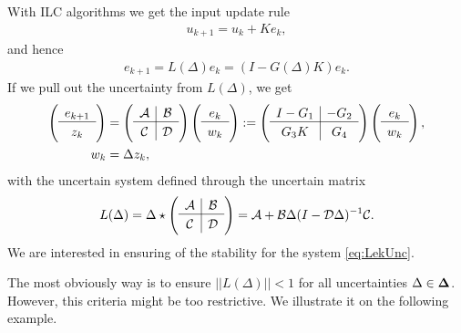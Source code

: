 With ILC algorithms we get the input update rule
\begin{align}
u_{k+1} = u_k + Ke_k,
\end{align}
and hence 
\begin{align}
\label{eq:LekUnc}
e_{k+1} = L(\Delta)e_k = (I - G(\Delta)K) e_k.
\end{align}
If we pull out the uncertainty from $L(\Delta)$, we get 
%
\begin{align}
\begin{split}
\left(\begin{array}{c}
e_{k+1} \\ \hline z_k
\end{array}\right) &= 
\left(\begin{array}{c| c}
\c{A} & \c{B} \\
\hline
\c{C} & \c{D}
\end{array}\right) \left(\begin{array}{c}
e_{k}  \\\hline w_k
\end{array}\right):= 
\left(\begin{array}{c|c}
I - G_1 & -G_2 \\
\hline
G_3 K & G_4
\end{array}\right)
\left(\begin{array}{c}
e_{k}  \\\hline w_k
\end{array}\right),\\
w_k &= \Delta z_k,
\end{split}
\end{align}
with the uncertain system defined through the uncertain matrix 
\begin{align}
\label{eq: LstarDelta}
L(\Delta) = \Delta \star \left(\begin{array}{c| c}
\c{A} & \c{B} \\
\hline
\c{C} & \c{D}
\end{array}\right) = \c{A} + \c{B} \Delta (I - \c{D}\Delta)^{-1}\c{C}. 
\end{align}
 We are interested in ensuring of the stability for the system \eqref{eq:LekUnc}. 
 
 The most obviously way is to ensure $||L(\Delta)||<1$ for all uncertainties $\Delta \in \mathbf{\Delta}$.
However, this criteria might be too restrictive. We illustrate it on the following example. 

